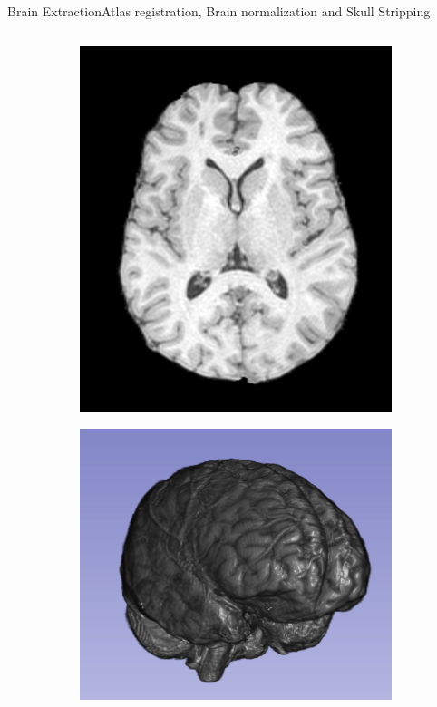 \documentclass[]{standalone}
\begin{document}
\begin{frame}{Brain Extraction}{Atlas registration, Brain normalization and Skull Stripping}
\begin{columns}
\begin{column}{0.55\textwidth}
\begin{figure}[h!]
				\hfill
				\begin{subfigure}{0.45\textwidth}
					\centering
					\includegraphics[scale=0.05]{./IMG/brain.jpg}
				\end{subfigure}
				\begin{subfigure}{0.99\textwidth}
					\centering
					\includegraphics[scale=0.1]{./IMG/3Dbrain.jpg}
				\end{subfigure}
			\end{figure}
			\end{column}
		\end{columns}
	\end{frame}
\end{document}
